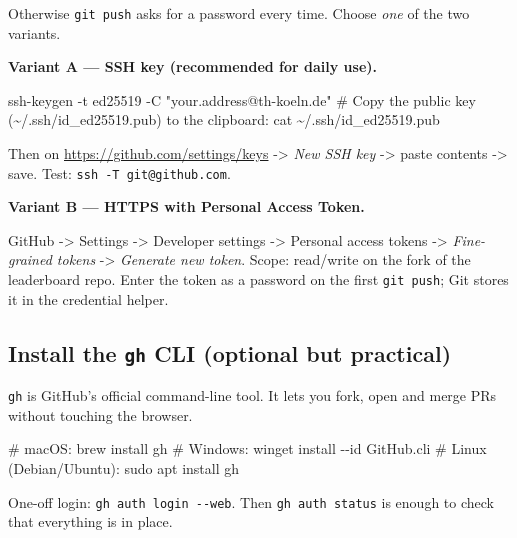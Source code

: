 \documentclass[
  english,
  letterpaper,
]{scrbook}
\newenvironment{Shaded}{\begin{snugshade}}{\end{snugshade}}
\newcommand{\AttributeTok}[1]{\textcolor[rgb]{0.40,0.45,0.13}{#1}}
\newcommand{\CommentTok}[1]{\textcolor[rgb]{0.37,0.37,0.37}{#1}}
\newcommand{\ExtensionTok}[1]{\textcolor[rgb]{0.00,0.23,0.31}{#1}}
\newcommand{\FunctionTok}[1]{\textcolor[rgb]{0.28,0.35,0.67}{#1}}
\newcommand{\NormalTok}[1]{\textcolor[rgb]{0.00,0.23,0.31}{#1}}
\newcommand{\StringTok}[1]{\textcolor[rgb]{0.13,0.47,0.30}{#1}}
\begin{document}
Otherwise \texttt{git\ push} asks for a password every time. Choose
\emph{one} of the two variants.

\textbf{Variant A --- SSH key (recommended for daily use).}

\begin{Shaded}
\begin{Highlighting}[]
\FunctionTok{ssh{-}keygen} \AttributeTok{{-}t}\NormalTok{ ed25519 }\AttributeTok{{-}C} \StringTok{"your.address@th{-}koeln.de"}
\CommentTok{\# Copy the public key (\textasciitilde{}/.ssh/id\_ed25519.pub) to the clipboard:}
\FunctionTok{cat}\NormalTok{ \textasciitilde{}/.ssh/id\_ed25519.pub}
\end{Highlighting}
\end{Shaded}

Then on \url{https://github.com/settings/keys} -\textgreater{} \emph{New
SSH key} -\textgreater{} paste contents -\textgreater{} save. Test:
\texttt{ssh\ -T\ git@github.com}.

\textbf{Variant B --- HTTPS with Personal Access Token.}

GitHub -\textgreater{} Settings -\textgreater{} Developer settings
-\textgreater{} Personal access tokens -\textgreater{}
\emph{Fine-grained tokens} -\textgreater{} \emph{Generate new token}.
Scope: read/write on the fork of the leaderboard repo. Enter the token
as a password on the first \texttt{git\ push}; Git stores it in the
credential helper.

\subsection{\texorpdfstring{Install the \texttt{gh} CLI (optional but
practical)}{Install the gh CLI (optional but practical)}}\label{install-the-gh-cli-optional-but-practical}

\texttt{gh} is GitHub's official command-line tool. It lets you fork,
open and merge PRs without touching the browser.

\begin{Shaded}
\begin{Highlighting}[]
\CommentTok{\# macOS:}
\ExtensionTok{brew}\NormalTok{ install gh}
\CommentTok{\# Windows:}
\ExtensionTok{winget}\NormalTok{ install }\AttributeTok{{-}{-}id}\NormalTok{ GitHub.cli}
\CommentTok{\# Linux (Debian/Ubuntu):}
\FunctionTok{sudo}\NormalTok{ apt install gh}
\end{Highlighting}
\end{Shaded}

One-off login: \texttt{gh\ auth\ login\ -\/-web}. Then
\texttt{gh\ auth\ status} is enough to check that everything is in
place.
\end{document}
